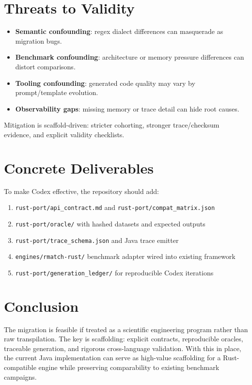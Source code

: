 \documentclass[11pt]{article}
\begin{document}
\section{Threats to Validity}
\begin{itemize}
  \item \textbf{Semantic confounding}: regex dialect differences can masquerade as migration bugs.
  \item \textbf{Benchmark confounding}: architecture or memory pressure differences can distort comparisons.
  \item \textbf{Tooling confounding}: generated code quality may vary by prompt/template evolution.
  \item \textbf{Observability gaps}: missing memory or trace detail can hide root causes.
\end{itemize}
Mitigation is scaffold-driven: stricter cohorting, stronger trace/checksum evidence, and explicit validity checklists.

\section{Concrete Deliverables}
To make Codex effective, the repository should add:
\begin{enumerate}
  \item \texttt{rust-port/api\_contract.md} and \texttt{rust-port/compat\_matrix.json}
  \item \texttt{rust-port/oracle/} with hashed datasets and expected outputs
  \item \texttt{rust-port/trace\_schema.json} and Java trace emitter
  \item \texttt{engines/rmatch-rust/} benchmark adapter wired into existing framework
  \item \texttt{rust-port/generation\_ledger/} for reproducible Codex iterations
\end{enumerate}

\section{Conclusion}
The migration is feasible if treated as a scientific engineering program rather than raw transpilation. The key is scaffolding: explicit contracts, reproducible oracles, traceable generation, and rigorous cross-language validation. With this in place, the current Java implementation can serve as high-value scaffolding for a Rust-compatible engine while preserving comparability to existing benchmark campaigns.



\end{document}
